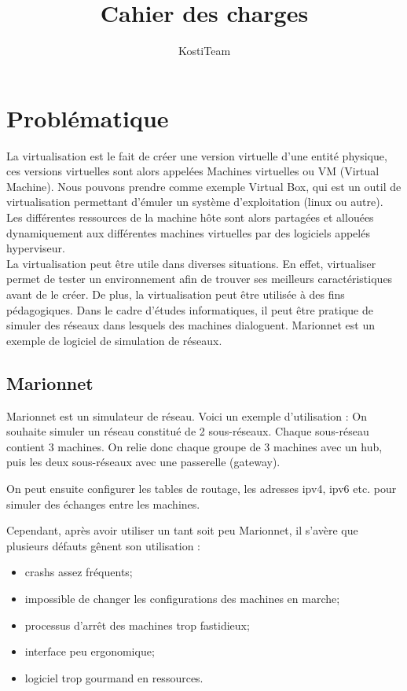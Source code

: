 \documentclass[a4paper]{article}
\author{KostiTeam}
\title{Cahier des charges}
\begin{document}
\maketitle
\newpage
\tableofcontents
\newpage

\section{Probl\'ematique}
La virtualisation est le fait de cr\'eer une version virtuelle d'une entit\'e physique, ces versions virtuelles
sont alors appel\'ees Machines virtuelles ou VM (Virtual Machine). Nous pouvons prendre comme exemple Virtual
Box, qui est un outil de virtualisation permettant d'\'emuler un syst\`eme d'exploitation (linux ou autre).
Les diff\'erentes ressources de la machine h\^ote sont alors partag\'ees et allou\'ees dynamiquement aux
diff\'erentes machines virtuelles par des logiciels appel\'es hyperviseur.\\

La virtualisation peut \^etre utile dans diverses situations. En effet, virtualiser permet de tester un environnement afin de trouver ses meilleurs caractéristiques avant de le créer. De plus, la virtualisation peut être utilisée à des fins pédagogiques. Dans le cadre d'\'etudes informatiques, il peut
\^etre pratique de simuler des r\'eseaux dans lesquels des machines dialoguent. Marionnet est un exemple de
logiciel de simulation de r\'eseaux. 

\subsection {Marionnet}
Marionnet est un simulateur de réseau. Voici un exemple d'utilisation : 
On souhaite simuler un réseau constitué de 2 sous-réseaux. Chaque sous-réseau contient 3 machines.
On relie donc chaque groupe de 3 machines avec un hub, puis les deux sous-réseaux avec une passerelle (gateway).

On peut ensuite configurer les tables de routage, les adresses ipv4, ipv6 etc. pour simuler des échanges entre les machines.

Cependant, apr\`es avoir utiliser un tant soit peu Marionnet, il s'av\`ere que
plusieurs d\'efauts g\^enent son utilisation : 
\begin{itemize}
  \item crashs assez fr\'equents;
  \item impossible de changer les configurations des machines en marche;
  \item processus d'arr\^et des machines trop fastidieux;
  \item interface peu ergonomique;
  \item logiciel trop gourmand en ressources.
\end{itemize}
\end{document}
